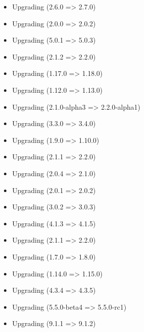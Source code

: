 \begin{itemize}
        \item Upgrading  (2.6.0 => 2.7.0)
        \item Upgrading  (2.0.0 => 2.0.2)
        \item Upgrading  (5.0.1 => 5.0.3)
        \item Upgrading  (2.1.2 => 2.2.0)
        \item Upgrading  (1.17.0 => 1.18.0)
        \item Upgrading  (1.12.0 => 1.13.0)
        \item Upgrading  (2.1.0-alpha3 => 2.2.0-alpha1)
        \item Upgrading  (3.3.0 => 3.4.0)
        \item Upgrading  (1.9.0 => 1.10.0)
        \item Upgrading  (2.1.1 => 2.2.0)
        \item Upgrading  (2.0.4 => 2.1.0)
        \item Upgrading  (2.0.1 => 2.0.2)
        \item Upgrading  (3.0.2 => 3.0.3)
        \item Upgrading  (4.1.3 => 4.1.5)
        \item Upgrading  (2.1.1 => 2.2.0)
        \item Upgrading  (1.7.0 => 1.8.0)
        \item Upgrading  (1.14.0 => 1.15.0)
        \item Upgrading  (4.3.4 => 4.3.5)
        \item Upgrading  (5.5.0-beta4 => 5.5.0-rc1)
        \item Upgrading  (9.1.1 => 9.1.2)
    \end{itemize}

